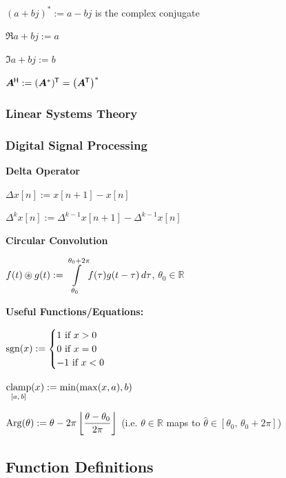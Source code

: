 \documentclass[11pt]{article}
\begin{document}
  \((a + bj)^* := a - bj\) is the complex conjugate

  \(\Re{a + bj} := a\)

  \(\Im{a + bj} := b\)

  \(\bm{A}^{{\mkern-1.5mu\mathsf{H}}} := (\bm{A}^*)^{\mkern-1.5mu\mathsf{T}} = {\left( \bm{A}^{\mkern-1.5mu\mathsf{T}} \right)}^*\)

  \pagebreak

  \subsubsection{Linear Systems Theory}


  \pagebreak

  \subsubsection{Digital Signal Processing}

  \textbf{Delta Operator}

  \(\Delta x[n] := x[n + 1] - x[n]\)

  \(\Delta^k x[n] := \Delta^{k - 1} x[n + 1] - \Delta^{k - 1}x[n]\)

  \vspace{12pt}

  \textbf{Circular Convolution}

  \(f(t) \oast g(t) :=
  \intlim{\theta_0}{\theta_0 + 2\pi} f(\tau)g(t - \tau)\,d\tau\),
  \(\theta_0 \in \mathbb{R}\)

  \vspace{12pt}

  \textbf{Useful Functions/Equations:}

  \(\mathrm{sgn}(x) := \begin{cases}
    1 \textrm{ if } x > 0 \\
    0 \textrm{ if } x = 0 \\
    -1 \textrm{ if } x < 0 \\
  \end{cases}\)

  \(\displaystyle \operatorname*{clamp}_{[a,\, b]}(x) := \min(\max(x, a), b)\)

  \(\mathrm{Arg}(\theta) := \theta  - 2\pi\left\lfloor\dfrac{\theta - \theta_0}{2\pi}\right\rfloor\)
  (i.e. \(\theta \in \mathbb{R}\) maps to \(\hat{\theta} \in [\theta_0,\, \theta_0 + 2\pi]\))


  \pagebreak

  \subsection{Function Definitions}
\end{document}
